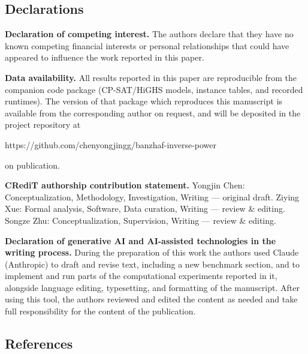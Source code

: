 \documentclass[
]{article}
\begin{document}
\subsection{Declarations}\label{declarations}

\textbf{Declaration of competing interest.} The authors declare that
they have no known competing financial interests or personal
relationships that could have appeared to influence the work reported in
this paper.

\textbf{Data availability.} All results reported in this paper are
reproducible from the companion code package (CP-SAT/HiGHS models,
instance tables, and recorded runtimes). The version of that package
which reproduces this manuscript is available from the corresponding
author on request, and will be deposited in the project repository at

https://github.com/chenyongjingg/banzhaf-inverse-power

on publication.

\textbf{CRediT authorship contribution statement.} Yongjin Chen:
Conceptualization, Methodology, Investigation, Writing --- original
draft. Ziying Xue: Formal analysis, Software, Data curation, Writing ---
review \& editing. Songze Zhu: Conceptualization, Supervision, Writing
--- review \& editing.

\textbf{Declaration of generative AI and AI-assisted technologies in the
writing process.} During the preparation of this work the authors used
Claude (Anthropic) to draft and revise text, including a new benchmark
section, and to implement and run parts of the computational experiments
reported in it, alongside language editing, typesetting, and formatting
of the manuscript. After using this tool, the authors reviewed and
edited the content as needed and take full responsibility for the
content of the publication.

\subsection{References}\label{references}
\end{document}
